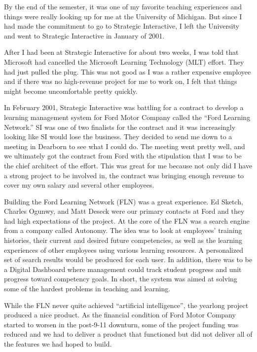 \documentclass[12pt]{book}
\begin{document}
By the end of the semester, it was one of my favorite teaching
experiences and things were really looking up for me at the
University of Michigan.  But since I had made the commitment
to go to Strategic Interactive, I left the University and
went to Strategic Interactive in January of 2001.

After I had been at Strategic Interactive for about two weeks,
I was told that Microsoft had cancelled the Microsoft
Learning Technology (MLT) effort.  They had just pulled the plug.
This was not good as I was a rather expensive employee
and if there was no high-revenue project for me to work on,
I felt that things might become uncomfortable pretty quickly.

In February 2001, Strategic Interactive was battling for a contract
to develop a learning management system for Ford Motor Company
called the ``Ford Learning Network.''  SI was one of two finalists
for the contract and it was increasingly looking like SI would
lose the business.  They decided to send me down to a meeting in
Dearborn to see what I could do.  The meeting went pretty well,
and we ultimately got the contract from Ford with the stipulation that
I was to be the chief architect of the effort.  This was great
for me because not only did I have a strong project to be involved in,
the contract was bringing enough revenue to cover my own salary and
several other employees.

Building the Ford Learning Network (FLN) was a great experience.  Ed Sketch,
Charles Ogunwy, and Matt Deseck were our primary contacts at Ford and
they had high expectations of the project.  At the core of the FLN
was a search engine
from a company called Autonomy.  The idea was to look at employees'
training histories, their current and desired future competencies, as well as
the learning experiences of other employees using various
learning resources. A personalized set of search results would be produced for
each user.  In addition, there was to be a Digital Dashboard where management
could track student progress and unit progress toward competency goals.
In short, the system was aimed at solving some of the hardest problems
in teaching and learning.

While the FLN never quite achieved ``artificial intelligence'', the
yearlong project produced a nice product.  As the financial
condition of Ford Motor Company started to worsen in the post-9-11
downturn, some of the project
funding was reduced and we had to deliver a product that functioned but
did not deliver all of the features we had hoped to build.
\end{document}
